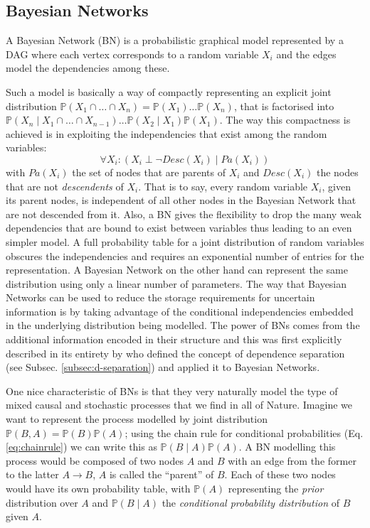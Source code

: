 \subsection{Bayesian Networks} \label{subsec:bayesiannetworks}
\begin{definition}
	A Bayesian Network (BN) is a probabilistic graphical model represented by a DAG where each vertex corresponds to a random variable $X_i$ and the edges model the dependencies among these.
\end{definition}
Such a model is basically a way of compactly representing an explicit joint distribution $\mathbb{P}(X_1 \cap \ldots \cap X_n) = \mathbb{P}(X_1) \ldots \mathbb{P}(X_n)$, that is factorised into $\mathbb{P}(X_n \mid X_1 \cap \ldots \cap X_{n-1}) \ldots \mathbb{P}(X_2 \mid X_1 ) \mathbb{P}(X_1) $.
The way this compactness is achieved is in exploiting the independencies that exist among the random variables:
\begin{equation} \label{eq:bnindependencies}
	\forall X_i:  ( X_i \perp \neg Desc(X_i) \mid Pa(X_i))
\end{equation}
with $Pa(X_i)$ the set of nodes that are parents of $X_i$ and $Desc(X_i)$ the nodes that are not \textit{descendents} of $X_i$.
That is to say, every random variable $X_i$, given its parent nodes, is independent of all other nodes in the Bayesian Network that are not descended from it.
Also, a BN gives the flexibility to drop the many weak dependencies that are bound to exist between variables thus leading to an even simpler model.
A full probability table for a joint distribution of random variables obscures the independencies and requires an exponential number of entries for the representation.
A Bayesian Network on the other hand can represent the same distribution using only a linear number of parameters.
The way that Bayesian Networks can be used to reduce the storage requirements for uncertain information is by taking advantage of the conditional independencies embedded in the underlying distribution being modelled.
The power of BNs comes from the additional information encoded in their structure and this was first explicitly described in its entirety by \cite{Pearl1988} who defined the concept of dependence separation (see Subsec. \ref{subsec:d-separation}) and applied it to Bayesian Networks.

One nice characteristic of BNs is that they very naturally model the type of mixed causal and stochastic processes that we find in all of Nature.
Imagine we want to represent the process modelled by joint distribution $\mathbb{P}(B,A) = \mathbb{P}(B) \mathbb{P}(A)$; using the chain rule for conditional probabilities (Eq. \ref{eq:chainrule}) we can write this as $\mathbb{P}(B \mid A) \mathbb{P}(A)$.
A BN modelling this process would be composed of two nodes $A$ and $B$ with an edge from the former to the latter $A \rightarrow B$, $A$ is called the ``parent'' of $B$.  Each of these two nodes would have its own probability table, with $\mathbb{P}(A)$ representing the \textit{prior} distribution over $A$ and $\mathbb{P}(B \mid A)$ the \textit{conditional probability distribution} of $B$ given $A$.

